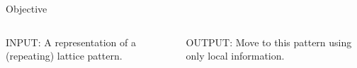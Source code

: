 \documentclass[10pt]{beamer}
\begin{document}
\begin{frame}{Objective}{}
\begin{block}{}
  \begin{columns}[T] %
    \begin{column}{.45\textwidth}
     \textcolor{scred}{INPUT:} \small{A representation of a (repeating)
     lattice pattern.}
    \end{column}%
    \begin{column}{.45\textwidth}
      \textcolor{scred}{OUTPUT:} \small{Move to this pattern using
        only local information.}
    \end{column}%
  \end{columns} 
\end{block}
\end{frame}
\end{document}
